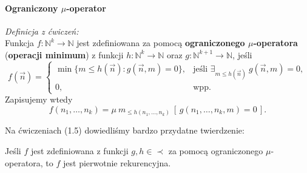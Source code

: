 \paragraph*{Ograniczony $\mu$-operator}
\textit{Definicja z ćwiczeń:} \\
Funkcja \( f : \mathbb{N}^k \to \mathbb{N} \) jest zdefiniowana za pomocą 
\textbf{ograniczonego \(\mu\)-operatora} (\textbf{operacji minimum}) 
z funkcji \( h : \mathbb{N}^k \to \mathbb{N} \) oraz \( g : \mathbb{N}^{k+1} \to \mathbb{N} \), jeśli
\[
    f(\vec{n}) =
    \begin{cases}
        \min \{ m \le h(\vec{n}) : g(\vec{n}, m) = 0 \}, & 
        \text{jeśli } \exists_{m \le h(\vec{n})} \ g(\vec{n}, m) = 0, \\
        0, & \text{wpp.}
    \end{cases}
\]
Zapisujemy wtedy
\[
    f(n_1, \ldots, n_k) = 
\mu \: m_{\le h(n_1, \ldots, n_k)} \ [\, g(n_1, \ldots, n_k, m) = 0 \,].
\]

Na ćwiczeniach (1.5) dowiedliśmy bardzo przydatne twierdzenie:
\begin{theorem}
    Jeśli \( f \) jest zdefiniowana z funkcji \( g, h \in \prec \) za pomocą ograniczonego \(\mu\)-operatora, to \( f \) jest pierwotnie rekurencyjna.
\end{theorem}